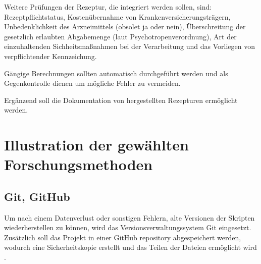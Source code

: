 \documentclass[12pt,a4paper]{article}
\begin{document}
Weitere Prüfungen der Rezeptur, die integriert werden sollen, sind: Rezeptpflichtstatus, Kostenübernahme von Krankenversicherungsträgern, Unbedenklichkeit des Arzneimittels (obsolet ja oder nein), Überschreitung der gesetzlich erlaubten Abgabemenge (laut Psychotropenverordnung), Art der einzuhaltenden Sichheitsmaßnahmen bei der Verarbeitung und das Vorliegen von verpflichtender Kennzeichung.



Gängige Berechnungen sollten automatisch durchgeführt werden und als Gegenkontrolle dienen um mögliche Fehler zu vermeiden.


Ergänzend soll die Dokumentation von hergestellten Rezepturen ermöglicht werden.








\section{Illustration der gewählten Forschungsmethoden}

\subsection{Git, GitHub}

Um nach einem Datenverlust oder sonstigen Fehlern, alte Versionen der Skripten wiederherstellen zu können, wird das Versionsverwaltungssystem Git eingesetzt. Zusätzlich soll das Projekt in einer GitHub repository abgespeichert werden, wodurch eine Sicherheitskopie erstellt und das Teilen der Dateien ermöglicht wird \cite{Blischak.2016}. 
% 

\end{document}
